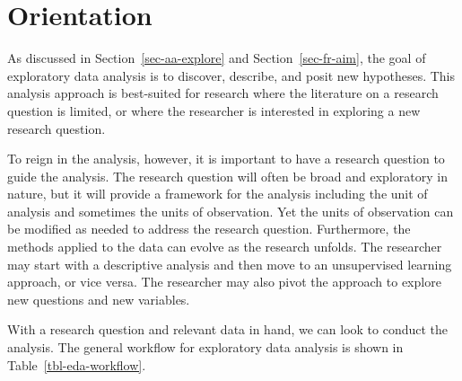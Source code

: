 \documentclass[
  letterpaper,
]{latex/krantz}
\theoremstyle{definition}
\theoremstyle{remark}
\begin{document}
\section{Orientation}\label{sec-eda-orientation}

As discussed in Section~\ref{sec-aa-explore} and
Section~\ref{sec-fr-aim}, the goal of exploratory data analysis is to
discover, describe, and posit new hypotheses. This analysis approach is
best-suited for research where the literature on a research question is
limited, or where the researcher is interested in exploring a new
research question.

To reign in the analysis, however, it is important to have a research
question to guide the analysis. The research question will often be
broad and exploratory in nature, but it will provide a framework for the
analysis including the unit of analysis and sometimes the units of
observation. Yet the units of observation can be modified as needed to
address the research question. Furthermore, the methods applied to the
data can evolve as the research unfolds. The researcher may start with a
descriptive analysis and then move to an unsupervised learning approach,
or vice versa. The researcher may also pivot the approach to explore new
questions and new variables.

With a research question and relevant data in hand, we can look to
conduct the analysis. The general workflow for exploratory data analysis
is shown in Table~\ref{tbl-eda-workflow}.
\end{document}

